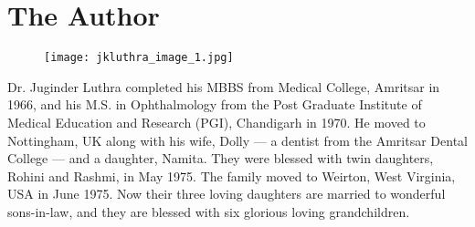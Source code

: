 \chapter{The Author}
\begin{figure}
	\texttt{[image: jkluthra\_image\_1.jpg]}
\end{figure}

Dr. Juginder Luthra completed his MBBS from Medical College, Amritsar in
1966, and his M.S. in Ophthalmology from the Post Graduate Institute of
Medical Education and Research (PGI), Chandigarh in 1970. He moved to
Nottingham, UK along with his wife, Dolly — a dentist from the Amritsar
Dental College — and a daughter, Namita. They were blessed with twin
daughters, Rohini and Rashmi, in May 1975. The family moved to Weirton,
West Virginia, USA in June 1975. Now their three loving daughters are
married to wonderful sons-in-law, and they are blessed with six glorious
loving grandchildren.
